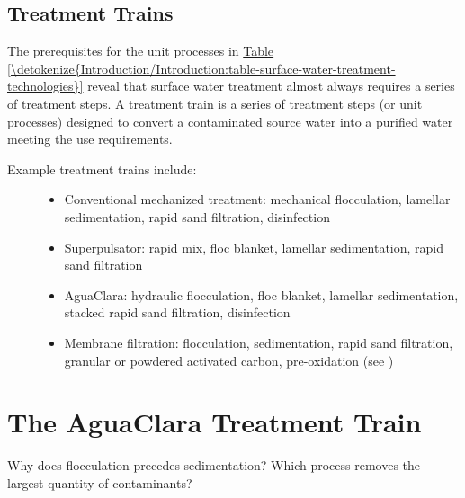 \documentclass[letterpaper,10pt,english]{sphinxmanual}
\begin{document}
\subsection{Treatment Trains}
\label{\detokenize{Introduction/Introduction:treatment-trains}}\label{\detokenize{Introduction/Introduction:heading-treatment-trains}}
The prerequisites for the unit processes in \hyperref[\detokenize{Introduction/Introduction:table-surface-water-treatment-technologies}]{Table \ref{\detokenize{Introduction/Introduction:table-surface-water-treatment-technologies}}} reveal that surface water treatment almost always requires a series of treatment steps. A treatment train is a series of treatment steps (or unit processes) designed to convert a contaminated source water into a purified water meeting the use requirements.
\begin{description}
\item[{Example treatment trains include:}] \leavevmode\begin{itemize}
\item {} 
Conventional mechanized treatment: mechanical flocculation, lamellar sedimentation, rapid sand filtration, disinfection

\item {} 
Superpulsator: rapid mix, floc blanket, lamellar sedimentation, rapid sand filtration

\item {} 
AguaClara: hydraulic flocculation, floc blanket, lamellar sedimentation, stacked rapid sand filtration, disinfection

\item {} 
Membrane filtration: flocculation, sedimentation, rapid sand filtration, granular or powdered activated carbon, pre-oxidation (see )

\end{itemize}

\end{description}


\section{The AguaClara Treatment Train}
\label{\detokenize{Introduction/Introduction:the-aguaclara-treatment-train}}\label{\detokenize{Introduction/Introduction:heading-the-aguaclara-treatment-train}}
Why does flocculation precedes sedimentation?
Which process removes the largest quantity of contaminants?
\end{document}
